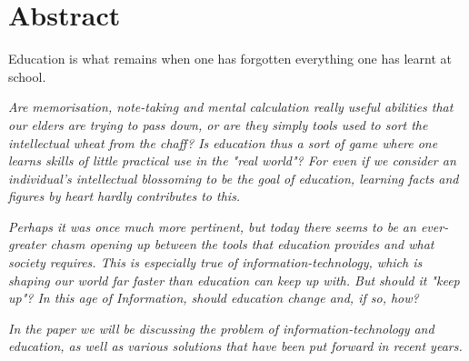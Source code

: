 
\chapter*{Abstract}\label{abstract}

\begin{coolquote}
\Large Education is what remains when one has forgotten everything one has learnt at school.
\end{coolquote}

\textit{Are memorisation, note-taking and mental calculation really useful abilities that our elders are trying to pass down, or are they simply tools used to sort the intellectual wheat from the chaff? Is education thus a sort of game where one learns skills of little practical use in the "real world"? For even if we consider an individual's intellectual blossoming to be the goal of education, learning facts and figures by heart hardly contributes to this.}

\textit{Perhaps it was once much more pertinent, but today there seems to be an ever-greater chasm opening up between the tools that education provides and what society requires. This is especially true of information-technology, which is shaping our world far faster than education can keep up with. But should it "keep up"? In this age of Information, should education change and, if so, how?}

\textit{In the paper we will be discussing the problem of information-technology and education, as well as various solutions that have been put forward in recent years.}